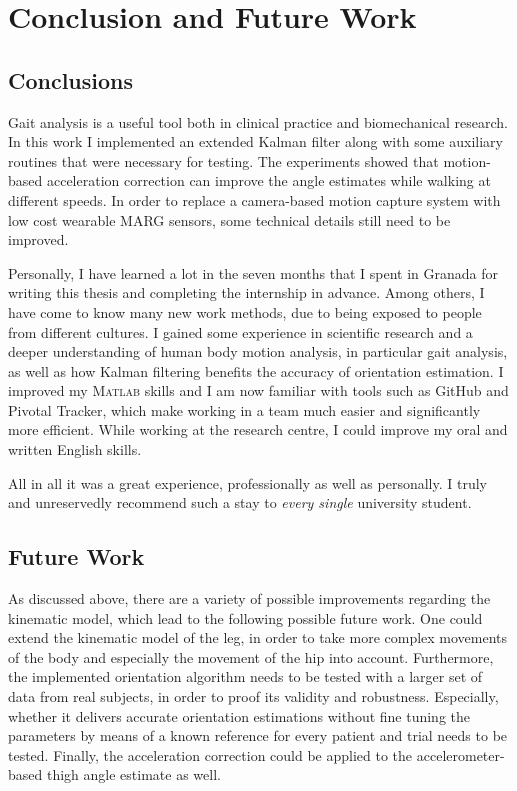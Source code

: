 \chapter{Conclusion and Future Work}
\label{ch:Conclusion and Future Work}

\section{Conclusions}

Gait analysis is a useful tool both in clinical practice and biomechanical research. In this work I implemented an extended Kalman filter along with some auxiliary routines that were necessary for testing. The experiments showed that motion-based acceleration correction can improve the angle estimates while walking at different speeds. In order to replace a camera-based motion capture system with low cost wearable MARG sensors, some technical details still need to be improved.

Personally, I have learned a lot in the seven months that I spent in Granada for writing this thesis and completing the internship in advance. Among others, I have come to know many new work methods, due to being exposed to people from different cultures. I gained some experience in scientific research and a deeper understanding of human body motion analysis, in particular gait analysis, as well as how Kalman filtering benefits the accuracy of orientation estimation. I improved my \textsc{Matlab}\textsuperscript{\textregistered} skills and I am now familiar with tools such as GitHub and Pivotal Tracker, which make working in a team much easier and significantly more efficient.  While working at the research centre, I could improve my oral and written English skills.

All in all it was a great experience, professionally as well as personally. I truly and unreservedly recommend such a stay to \emph{every single} university student.

\section{Future Work}

As discussed above, there are a variety of possible improvements regarding the kinematic model, which lead to the following possible future work. One could extend the kinematic model of the leg, in order to take more complex movements of the body and especially the movement of the hip into account. Furthermore, the implemented orientation algorithm needs to be tested with a larger set of data from real subjects, in order to proof its validity and robustness. Especially, whether it delivers accurate orientation estimations without fine tuning the parameters by means of a known reference for every patient and trial needs to be tested. Finally, the acceleration correction could be applied to the accelerometer-based thigh angle estimate as well.

